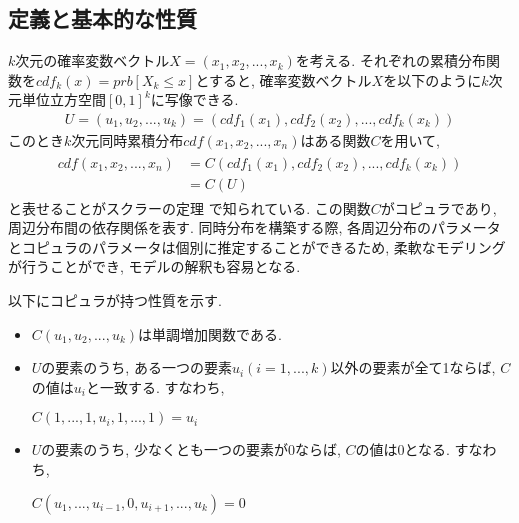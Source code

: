 \subsection{定義と基本的な性質}
$k$次元の確率変数ベクトル$X = (x_1,x_2,...,x_k)$を考える.
それぞれの累積分布関数を$cdf_k(x) = prb[X_k \leq x]$とすると,
確率変数ベクトル$X$を以下のように$k$次元単位立方空間$[0,1]^k$に写像できる.
\begin{align*}
    U = (u_1,u_2,...,u_k)
      = (cdf_1(x_1),cdf_2(x_2),...,cdf_k(x_k))
\end{align*}
このとき$k$次元同時累積分布$cdf(x_1, x_2, ..., x_n)$はある関数$C$を用いて,
\begin{align*}
  \begin{split}
  cdf(x_1, x_2, ..., x_n) &= C(cdf_1(x_1),cdf_2(x_2),...,cdf_k(x_k)) \\
  &= C(U)
  \end{split}
\end{align*}
と表せることがスクラーの定理 \cite{sklar}で知られている. この関数$C$がコピュラであり, 周辺分布間の依存関係を表す.
同時分布を構築する際, 各周辺分布のパラメータとコピュラのパラメータは個別に推定することができるため,
柔軟なモデリングが行うことができ, モデルの解釈も容易となる.\par
以下にコピュラが持つ性質を示す.
\par

\begin{itemize}
 \item
   $C(u_1,u_2,...,u_k)$は単調増加関数である.
 \item
    $Uの$要素のうち, ある一つの要素$u_i(i=1,...,k)$以外の要素が全て1ならば, $C$の値は$u_i$と一致する.
    すなわち,
   \begin{center}
   $C(1,...,1,u_i,1,...,1) = u_i$
   \end{center}
 \item
    $U$の要素のうち, 少なくとも一つの要素が0ならば, $C$の値は0となる.
    すなわち,
   \begin{center}
   $C(u_1,...,u_{i-1},0,u_{i+1},...,u_k) = 0$
   \end{center}
\end{itemize}
\par
